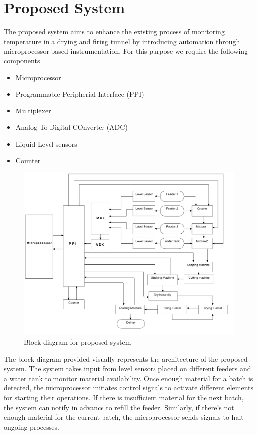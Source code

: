 \section{Proposed System}
\vspace{1em}  
The proposed system aims to enhance the existing process of monitoring temperature in a drying and firing tunnel by introducing automation through microprocessor-based instrumentation. For this purpose we require the following components.
\vspace{1em}
\begin{itemize}
    \item Microprocessor
    \item Programmable Peripherial Interface (PPI) 
    \item Multiplexer
    \item Analog To Digital COnverter (ADC)
    \item Liquid Level sensors
    \item Counter
\end{itemize}
\vspace{2em}
\begin{figure}[h]
    \centering
    \includegraphics[width=1\textwidth]{img/fc.jpg}
    \caption{Block diagram for proposed system}
\end{figure}
\vspace{5em}
The block diagram provided visually represents the architecture of the proposed system. The system takes input from level sensors placed on different feeders and a water tank to monitor material availability. Once enough material for a batch is detected, the microprocessor initiates control signals to activate different elements for starting their operations. If there is insufficient material for the next batch, the system can notify in advance to refill the feeder. Similarly, if there's not enough material for the current batch, the microprocessor sends signals to halt ongoing processes.

